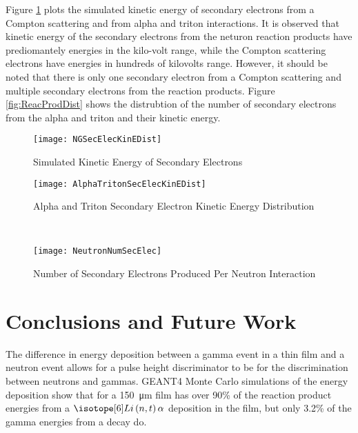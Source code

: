 \documentclass[draftcls,onecolumn]{IEEEtran}
\begin{document}
Figure \ref{fig:simKinE} plots the simulated kinetic energy of secondary electrons from a Compton scattering and from alpha and triton interactions.
It is observed that kinetic energy of the secondary electrons from the neturon reaction products have prediomantely energies in the kilo-volt range, while the Compton scattering electrons have energies in hundreds of kilovolts range. 
However, it should be noted that there is only one secondary electron from a Compton scattering and multiple secondary electrons from the reaction products.
Figure \ref{fig:ReacProdDist} shows the distrubtion of the number of secondary electrons from the alpha and triton and their kinetic energy.
\begin{figure}[ht]
    \centering
    \texttt{[image: NGSecElecKinEDist]}
    \caption{Simulated Kinetic Energy of Secondary Electrons }
    \label{fig:simKinE}
\end{figure}
\begin{figure*}[ht]
	\centering
	\begin{subfigure}[b]{0.45\textwidth}
    		\texttt{[image: AlphaTritonSecElecKinEDist]}
		\caption{Alpha and Triton Secondary Electron Kinetic Energy Distribution}
	\end{subfigure}%
	~
	\begin{subfigure}[b]{0.45\textwidth}
    		\texttt{[image: NeutronNumSecElec]}
		\caption{Number of Secondary Electrons Produced Per Neutron Interaction}
	\end{subfigure}%
	\caption{Neutron Reaction Products Secondary Electrons Energies}
	\label{fig:ReacProdDist}
\end{figure*}
\section{Conclusions and Future Work}
\label{sec:Conclusions}

The difference in energy deposition between a gamma event in a thin film and a neutron event allows for a pulse height discriminator to be for the discrimination between neutrons and gammas.
GEANT4 Monte Carlo simulations of the energy deposition show that for a \SI{150}{\um} film has over 90\% of the reaction product energies from a $\iso[6]{Li}\left(n,t\right)\alpha$ deposition in the film, but only 3.2\% of the gamma energies from a  decay do.
\end{document}
